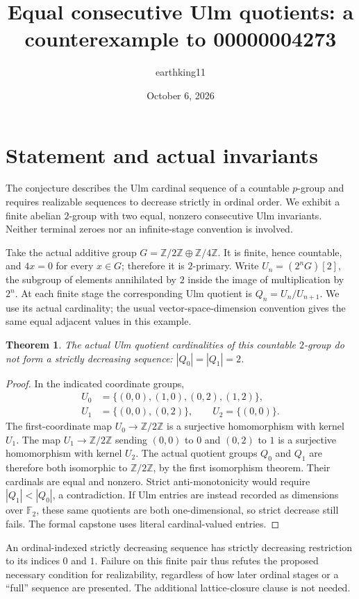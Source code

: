 \documentclass[10pt]{article}
\title{Equal consecutive Ulm quotients: a counterexample to 00000004273}
\author{earthking11}
\date{October 6, 2026}
\newtheorem{theorem}{Theorem}
\begin{document}
\maketitle
\section*{Statement and actual invariants}
The conjecture describes the Ulm cardinal sequence of a countable
$p$-group and requires realizable sequences to decrease strictly in
ordinal order. We exhibit a finite abelian $2$-group with two equal,
nonzero consecutive Ulm invariants. Neither terminal zeroes nor an
infinite-stage convention is involved.

Take the actual additive group
$G=\mathbb Z/2\mathbb Z\oplus\mathbb Z/4\mathbb Z$.
It is finite, hence countable, and $4x=0$ for every $x\in G$; therefore it
is $2$-primary. Write
$U_n=(2^nG)[2]$, the subgroup of elements annihilated by $2$ inside the
image of multiplication by $2^n$. At each finite stage the corresponding
Ulm quotient is $Q_n=U_n/U_{n+1}$. We use its actual cardinality; the
usual vector-space-dimension convention gives the same equal adjacent
values in this example.

\begin{theorem}
The actual Ulm quotient cardinalities of this countable $2$-group do
not form a strictly decreasing sequence: $|Q_0|=|Q_1|=2$.
\end{theorem}
\begin{proof}
In the indicated coordinate groups,
\[
\begin{split}
 U_0&=\{(0,0),(1,0),(0,2),(1,2)\},\\
 U_1&=\{(0,0),(0,2)\},\qquad U_2=\{(0,0)\}.
\end{split}
\]
The first-coordinate map $U_0\to\mathbb Z/2\mathbb Z$ is a surjective
homomorphism with kernel $U_1$. The map
$U_1\to\mathbb Z/2\mathbb Z$ sending $(0,0)$ to $0$ and $(0,2)$ to $1$
is a surjective homomorphism with kernel $U_2$. The actual quotient
groups $Q_0$ and $Q_1$ are therefore both isomorphic to
$\mathbb Z/2\mathbb Z$, by the first isomorphism theorem.
Their cardinals are equal and nonzero. Strict anti-monotonicity would
require $|Q_1|<|Q_0|$, a contradiction.
If Ulm entries are instead recorded as dimensions over $\mathbb F_2$,
these same quotients are both one-dimensional, so strict decrease still
fails. The formal capstone uses literal cardinal-valued entries.
\end{proof}

An ordinal-indexed strictly decreasing sequence has strictly decreasing
restriction to its indices $0$ and $1$. Failure on this finite pair thus
refutes the proposed necessary condition for realizability, regardless
of how later ordinal stages or a ``full'' sequence are presented. The
additional lattice-closure clause is not needed.
\end{document}
